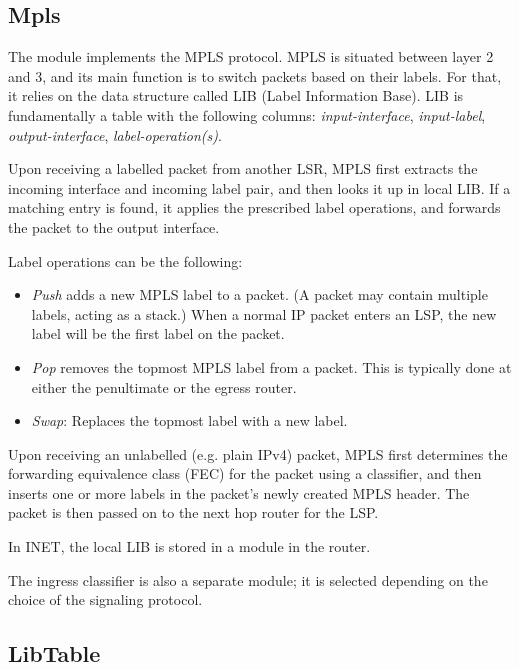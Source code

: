 \subsection{Mpls}

The  module implements the MPLS protocol. MPLS is situated between
layer 2 and 3, and its main function is to switch packets based on their labels.
For that, it relies on the data structure called LIB (Label Information Base).
LIB is fundamentally a table with the following columns: \textit{input-interface},
\textit{input-label}, \textit{output-interface}, \textit{label-operation(s)}.

Upon receiving a labelled packet from another LSR, MPLS first extracts the
incoming interface and incoming label pair, and then looks it up in local LIB. 
If a matching entry is found, it applies the prescribed label operations, and 
forwards the packet to the output interface. 

Label operations can be the following:

\begin{itemize}
  \item \textit{Push} adds a new MPLS label to a packet. (A packet may 
     contain multiple labels, acting as a stack.) When a normal IP packet
     enters an LSP, the new label will be the first label on the packet.
  \item \textit{Pop} removes the topmost MPLS label from a packet. 
     This is typically done at either the penultimate or the egress router.
  \item \textit{Swap}: Replaces the topmost label with a new label.
\end{itemize}

Upon receiving an unlabelled (e.g. plain IPv4) packet, MPLS first determines the
forwarding equivalence class (FEC) for the packet using a classifier, and then
inserts one or more labels in the packet's newly created MPLS header. The packet
is then passed on to the next hop router for the LSP.

In INET, the local LIB is stored in a  module in the router.

The ingress classifier is also a separate module; it is selected depending 
on the choice of the signaling protocol.


\subsection{LibTable}

